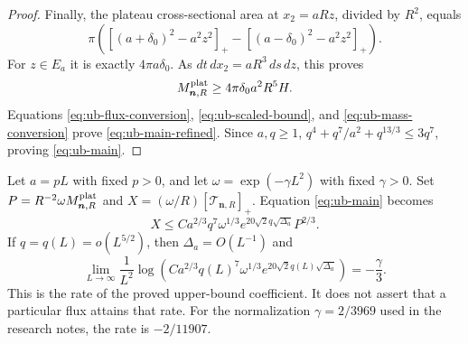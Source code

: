 \begin{proof}
Finally, the plateau cross-sectional area at $x_2=aRz$, divided by
$R^2$, equals
\[
 \pi\left(
 [(a+\delta_0)^2-a^2z^2]_+
 -[(a-\delta_0)^2-a^2z^2]_+\right).
\]
For $z\in E_a$ it is exactly $4\pi a\delta_0$.  As
$dt\,dx_2=aR^3\,ds\,dz$, this proves
\begin{equation}\label{eq:ub-mass-conversion}
 M^{\rm plat}_{\boldsymbol n,R}\ge4\pi\delta_0a^2R^5H.
\end{equation}
Equations \eqref{eq:ub-flux-conversion}, \eqref{eq:ub-scaled-bound},
and \eqref{eq:ub-mass-conversion} prove
\eqref{eq:ub-main-refined}.  Since $a,q\ge1$,
$q^4+q^7/a^2+q^{13/3}\le3q^7$, proving \eqref{eq:ub-main}.
\end{proof}

\begin{remark}\label{rem:ub-window}
Let $a=pL$ with fixed $p>0$, and let
$\omega=\exp(-\gamma L^2)$ with fixed $\gamma>0$.  Set
$P=R^{-2}\omega M^{\rm plat}_{\boldsymbol n,R}$ and
$X=(\omega/R)[\mathcal T_{\boldsymbol n,R}]_+$.
Equation \eqref{eq:ub-main} becomes
\[
 X\le C a^{2/3}q^7\omega^{1/3}e^{20\sqrt2q\sqrt{\Delta_a}}P^{2/3}.
\]
If $q=q(L)=o(L^{5/2})$, then $\Delta_a=O(L^{-1})$ and
\[
 \lim_{L\to\infty}\frac1{L^2}
   \log\left(Ca^{2/3}q(L)^7\omega^{1/3}
                   e^{20\sqrt2q(L)\sqrt{\Delta_a}}\right)
 =-\frac\gamma3.
\]
This is the rate of the proved upper-bound coefficient.  It does not
assert that a particular flux attains that rate.  For the normalization
$\gamma=2/3969$ used in the research notes, the rate is $-2/11907$.
\end{remark}
